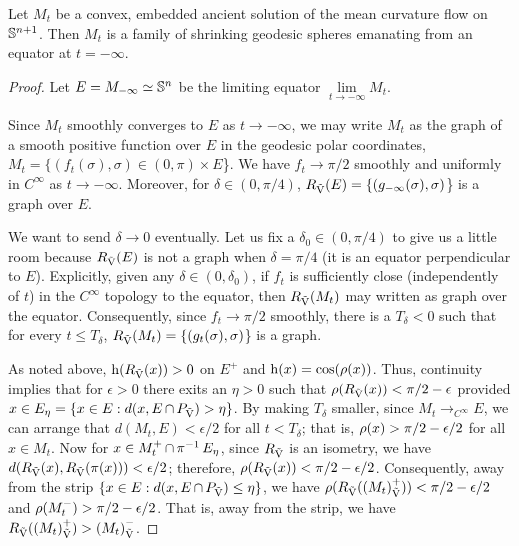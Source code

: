 \documentclass{amsart}
\begin{document}
\begin{theorem}
Let \(M_t\) be a convex, embedded ancient solution of the mean curvature flow on \(\S^{n+1}\). Then \(M_t\) is a family of shrinking geodesic spheres emanating from an equator at \(t=-\infty\).
\end{theorem}

\begin{proof}
Let \(E = M_{-\infty} \simeq \S^n\) be the limiting equator \(\lim\limits_{t\to-\infty} M_t\).

Since \(M_t\) smoothly converges to \(E\) as \(t\to-\infty\), we may write \(M_t\) as the graph of a smooth positive function over \(E\) in the geodesic polar coordinates, \(M_t = \{(f_t(\sigma), \sigma) \in (0,\pi) \times E\)\}. We have \(f_t \to \pi/2\) smoothly and uniformly in \(C^{\infty}\) as \(t \to -\infty\). Moreover, for \(\delta \in (0,\pi/4)\), \(\reflectionmap(E) = \{(g_{-\infty}(\sigma), \sigma)\)\} is a graph over \(E\).

We want to send \(\delta \to 0\) eventually. Let us fix a \(\delta_0 \in (0,\pi/4)\) to give us a little room because \(\reflectionmap(E)\) is not a graph when \(\delta = \pi/4\) (it is an equator perpendicular to \(E\)). Explicitly, given any \(\delta \in (0,\delta_0)\), if \(f_t\) is sufficiently close (independently of \(t\)) in the \(C^{\infty}\) topology to the equator, then \(\reflectionmap(M_t)\) may written as graph over the equator. Consequently, since \(f_t \to \pi/2\) smoothly, there is a \(T_{\delta} < 0\) such that for every \(t \leq T_{\delta}\), \(\reflectionmap(M_t) =\{ (g_t(\sigma), \sigma)\)\} is a graph.

As noted above, \(\height(\reflectionmap(x)) > 0\) on \(E^+\) and \(\height(x) = \cos(\radialdistance(x))\). Thus, continuity implies that for \(\epsilon > 0\) there exits an \(\eta>0\) such that \(\radialdistance(\reflectionmap(x)) < \pi/2 - \epsilon\) provided \(x \in E_{\eta} = \{x \in E: d(x, E \intersect \reflectionplane) > \eta\}\). By making \(T_{\delta}\) smaller, since \(M_t \to_{C^{\infty}} E\), we can arrange that \(d(M_t, E) < \epsilon/2\) for all \(t < T_{\delta}\); that is, \(\radialdistance (x) > \pi/2 - \epsilon/2\) for all \(x \in M_t\). Now for \(x \in M_t^+ \intersect \radialprojection^{-1} E_{\eta}\), since \(\reflectionmap\) is an isometry, we have \(d(\reflectionmap(x), \reflectionmap(\radialprojection(x))) < \epsilon/2\); therefore, \(\radialdistance(\reflectionmap(x)) < \pi/2 - \epsilon/2\). Consequently, away from the strip \(\{x \in E: d(x, E \intersect \reflectionplane) \leq \eta\}\), we have \(\radialdistance(\reflectionmap(\reflectionset{(M_t)}^+)) < \pi/2 - \epsilon/2\) and \(\radialdistance(M_t^-) > \pi/2 - \epsilon/2\). That is, away from the strip, we have \(\reflectionmap(\reflectionset{(M_t)}^+) > \reflectionset{(M_t)}^-\).


\end{proof}
\end{document}
